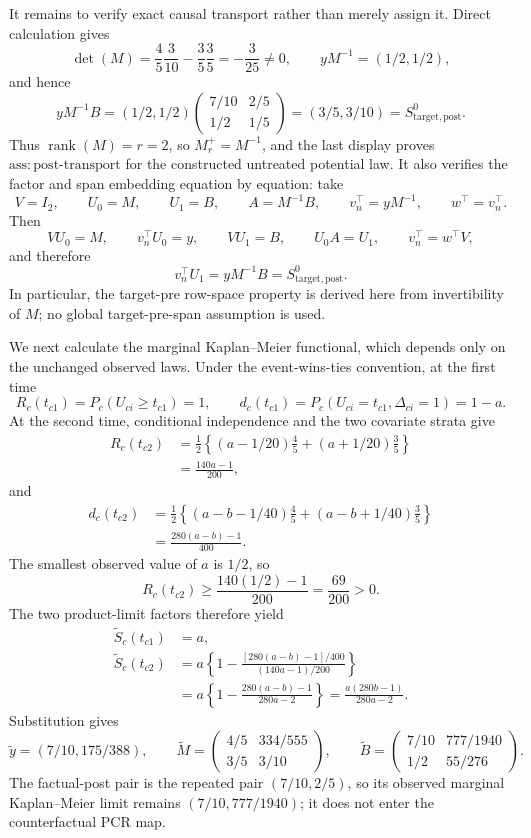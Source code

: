 It remains to verify exact causal transport rather than merely assign it. Direct calculation gives
\[
\det(M)=\frac45\frac3{10}-\frac35\frac35=-\frac3{25}\ne0,
\qquad
yM^{-1}=(1/2,1/2),
\]
and hence
\[
yM^{-1}B=(1/2,1/2)
\begin{pmatrix}7/10&2/5\\1/2&1/5\end{pmatrix}
=(3/5,3/10)=S^0_{\mathrm{target,post}}.
\]
Thus \(\operatorname{rank}(M)=r=2\), so \(M_r^+=M^{-1}\), and the last display proves \(\mathrm{ass{:}post\mbox{-}transport}\) for the constructed untreated potential law. It also verifies the factor and span embedding equation by equation: take
\[
V=I_2,\qquad U_0=M,\qquad U_1=B,\qquad
A=M^{-1}B,\qquad v_n^\top=yM^{-1},\qquad w^\top=v_n^\top.
\]
Then
\[
VU_0=M,\qquad v_n^\top U_0=y,
\qquad VU_1=B,\qquad U_0A=U_1,
\qquad v_n^\top=w^\top V,
\]
and therefore
\[
v_n^\top U_1=yM^{-1}B=S^0_{\mathrm{target,post}}.
\]
In particular, the target-pre row-space property is derived here from invertibility of \(M\); no global target-pre-span assumption is used.

We next calculate the marginal Kaplan--Meier functional, which depends only on the unchanged observed laws. Under the event-wins-ties convention, at the first time
\[
R_c(t_{c1})=P_c(U_{ci}\ge t_{c1})=1,
\qquad
d_c(t_{c1})=P_c(U_{ci}=t_{c1},\Delta_{ci}=1)=1-a.
\]
At the second time, conditional independence and the two covariate strata give
\[
\begin{aligned}
R_c(t_{c2})
&=\frac12\left\{(a-1/20)\frac45+(a+1/20)\frac35\right\}\\
&=\frac{140a-1}{200},
\end{aligned}
\]
and
\[
\begin{aligned}
d_c(t_{c2})
&=\frac12\left\{(a-b-1/40)\frac45
 +(a-b+1/40)\frac35\right\}\\
&=\frac{280(a-b)-1}{400}.
\end{aligned}
\]
The smallest observed value of \(a\) is \(1/2\), so
\[
R_c(t_{c2})\ge\frac{140(1/2)-1}{200}=\frac{69}{200}>0.
\]
The two product-limit factors therefore yield
\[
\begin{aligned}
\widetilde S_c(t_{c1})&=a,\\
\widetilde S_c(t_{c2})
&=a\left\{1-\frac{[280(a-b)-1]/400}{(140a-1)/200}\right\}\\
&=a\left\{1-\frac{280(a-b)-1}{280a-2}\right\}
=\frac{a(280b-1)}{280a-2}.
\end{aligned}
\]
Substitution gives
\[
\widetilde y=(7/10,175/388),\qquad
\widetilde M=\begin{pmatrix}4/5&334/555\\3/5&3/10\end{pmatrix},\qquad
\widetilde B=\begin{pmatrix}7/10&777/1940\\1/2&55/276\end{pmatrix}.
\]
The factual-post pair is the repeated pair \((7/10,2/5)\), so its observed marginal Kaplan--Meier limit remains \((7/10,777/1940)\); it does not enter the counterfactual PCR map.

